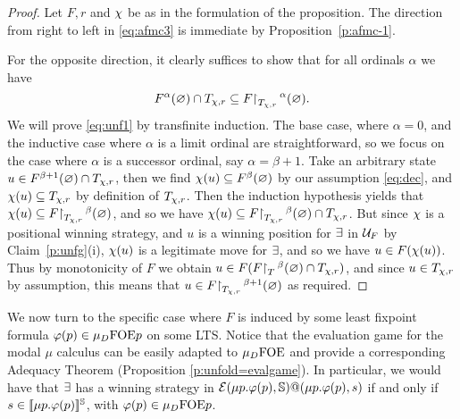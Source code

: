 \begin{proof}
Let $F,r$ and $\chi$ be as in the formulation of the proposition.
The direction from right to left in \eqref{eq:afmc3} is immediate by
Proposition~\ref{p:afmc-1}.

For the opposite direction, it clearly suffices to show that for all ordinals 
$\alpha$ we have
\begin{equation}
\label{eq:unf1}
F^{\al}(\nada) \cap T_{\ystrat,r} \sse F\rst{T_{\ystrat,r}}^{\alpha}(\nada).
\end{equation}
We will prove \eqref{eq:unf1} by transfinite induction.
The base case, where $\alpha = 0$, and the inductive case where $\alpha$ is a 
limit ordinal are straightforward, so we focus on the case where $\alpha$ is a 
successor ordinal, say $\alpha = \beta +1$.
Take an arbitrary state $u \in F^{\beta+1}(\varnothing) \cap T_{\chi,r}$, then we 
find $\chi(u) \subseteq F^{\beta}(\varnothing)$ by our assumption \eqref{eq:dec}, and 
$\chi(u) \subseteq T_{\chi,r}$ by definition of $T_{\chi,r}$.
Then the induction hypothesis yields that 
$\chi(u) \subseteq F{\upharpoonright}_{T_{\chi,r}}\,^{\beta}(\varnothing)$, and so we have 
$\chi(u) \subseteq F{\upharpoonright}_{T_{\chi,r}}\,^{\beta}(\varnothing) \cap T_{\chi,r}$.
But since $\chi$ is a positional winning strategy, and $u$ is a winning 
position for $\exists$ in $\mathcal{U}_{F}$ by Claim~\ref{p:unfg}(i), $\chi(u)$ is a
legitimate move for $\exists$, and so we have $u \in F(\chi(u))$.
Thus by monotonicity of $F$ we obtain $u \in 
F(F{\upharpoonright}_{T}\,^{\beta}(\varnothing) \cap T_{\chi,r})$, and since $u \in T_{\chi,r}$ 
by assumption, this means that $u \in F{\upharpoonright}_{T_{\chi,r}}\,^{\beta+1}(\varnothing)$ as 
required.
\end{proof}







We now turn to the specific case where $F$ is induced by some least fixpoint 
formula $\varphi(p) \in \mu_{D}\mathrm{FOE}{p}$ on some LTS. Notice that the evaluation game for the modal $\mu$ calculus can be easily adapted to $\mu_{D}\mathrm{FOE}$ and provide a corresponding Adequacy Theorem (Proposition \ref{p:unfold=evalgame}). In particular, we would have that 
$\exists$ has a winning strategy in  $\mathcal{E}(\mu p.\varphi(p),\mathbb{S})@(\mu p.\varphi(p),s)$ if and only if $s \in [\![ \mu p.\varphi(p) ]\!]^{\mathbb{S}}$, with $\varphi(p) \in \mu_{D}\mathrm{FOE}{p}$.

